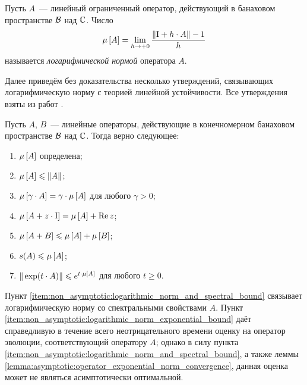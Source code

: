 \begin{definition}
    \label{definition:non_asymptotic:logarithmic_norm}
    Пусть $ A $~--- линейный ограниченный оператор, действующий в банаховом пространстве $ \mathcal{B} $ над $ \mathbb{C} $.
    Число
    \begin{equation}
        \label{eq:logarithmic_norm}
        \mu \left[ A \right] = \lim_{h \to +0} \frac{\| \mathrm{I} + h \cdot A \| - 1}{h}
    \end{equation}
    называется \emph{логарифмической нормой} оператора $ A $.
\end{definition}

Далее приведём без доказательства несколько утверждений,
связывающих логарифмическую норму с теорией линейной устойчивости.
Все утверждения взяты из работ \cite{soderlind2006lognorm, lambert1991methods}.

\begin{statement}
    \label{statement:non_asymptotic:logarithmic_norm_properties}
    Пусть $ A $, $ B $~--- линейные операторы, действующие в конечномерном банаховом пространстве $ \mathcal{B} $ над $ \mathbb{C} $.
    Тогда верно следующее:
    \begin{enumerate}[itemsep=0em]
        \item $ \mu \left[ A \right] $ определена;
        \item $ \mu \left[ A \right] \leqslant \| A \| $;
        \item $ \mu \left[ \gamma \cdot A \right] = \gamma \cdot \mu \left[ A \right] $ для любого $ \gamma > 0 $;
        \item $ \mu \left[ A + z \cdot \mathrm{I} \right] = \mu \left[ A \right] + \operatorname{Re} z $;
        \item $ \mu \left[ A + B \right] \leqslant \mu \left[ A \right] + \mu \left[ B \right] $;
        \item $ s(A) \leqslant \mu \left[ A \right] $; \label{item:non_asymptotic:logarithmic_norm_and_spectral_bound}
        \item $ \| \exp(t \cdot A) \| \leqslant e^{t \cdot \mu \left[ A \right]} $ для любого $ t \geqslant 0 $. \label{item:non_asymptotic:logarithmic_norm_exponential_bound}
    \end{enumerate}
\end{statement}

Пункт \ref{item:non_asymptotic:logarithmic_norm_and_spectral_bound}
связывает логарифмическую норму со спектральными свойствами $ A $.
Пункт \ref{item:non_asymptotic:logarithmic_norm_exponential_bound}
даёт справедливую в течение всего неотрицательного времени оценку на оператор эволюции,
соответствующий оператору $ A $;
однако в силу пункта \ref{item:non_asymptotic:logarithmic_norm_and_spectral_bound},
а также леммы \ref{lemma:asymptotic:operator_exponential_norm_convergence},
данная оценка может не являться асимптотически оптимальной.

